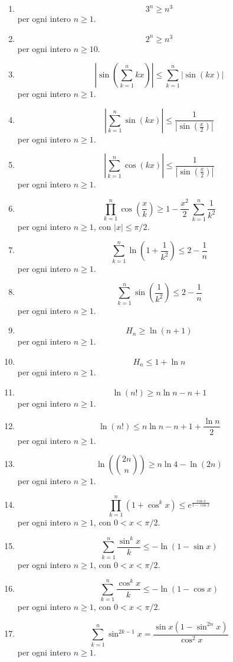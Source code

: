 \documentclass[11pt,a4paper]{article}
\begin{document}
\begin{enumerate}
\item \[ 3^{n} \ge n^{3} \]
{\small per ogni intero $n\ge 1$.}
\item \[ 2^{n} \ge n^{3} \]
{\small per ogni intero $n\ge 10$.}
\item \[ \left|\sin\left(\sum_{k=1}^{n} k x\right)\right| \le \sum_{k=1}^{n} \left|\sin\left(k x\right)\right| \]
{\small per ogni intero $n\ge 1$.}
\item \[ \left|\sum_{k=1}^{n} \sin\left(k x\right)\right| \le \frac{1}{\left|\sin\left(\frac{x}{2}\right)\right|} \]
{\small per ogni intero $n\ge 1$.}
\item \[ \left|\sum_{k=1}^{n} \cos\left(k x\right)\right| \le \frac{1}{\left|\sin\left(\frac{x}{2}\right)\right|} \]
{\small per ogni intero $n\ge 1$.}
\item \[ \prod_{k=1}^{n} \cos\left(\frac{x}{k}\right) \ge 1 - \frac{x^{2}}{2}\,\sum_{k=1}^{n} \frac{1}{k^{2}} \]
{\small per ogni intero $n\ge 1$, con $|x|\le\pi/2$.}
\item \[ \sum_{k=1}^{n} \ln\left(1 + \frac{1}{k^{2}}\right) \le 2 - \frac{1}{n} \]
{\small per ogni intero $n\ge 1$.}
\item \[ \sum_{k=1}^{n} \sin\left(\frac{1}{k^{2}}\right) \le 2 - \frac{1}{n} \]
{\small per ogni intero $n\ge 1$.}
\item \[ H_{n} \ge \ln\left(n + 1\right) \]
{\small per ogni intero $n\ge 1$.}
\item \[ H_{n} \le 1 + \ln n \]
{\small per ogni intero $n\ge 1$.}
\item \[ \ln\left(n!\right) \ge n\ln n - n + 1 \]
{\small per ogni intero $n\ge 1$.}
\item \[ \ln\left(n!\right) \le n\ln n - n + 1 + \frac{\ln n}{2} \]
{\small per ogni intero $n\ge 1$.}
\item \[ \ln\left(\binom{2n}{n}\right) \ge n\ln 4 - \ln\left(2n\right) \]
{\small per ogni intero $n\ge 1$.}
\item \[ \prod_{k=1}^{n} \left(1 + \cos^{k} x\right) \le e^{\frac{\cos x}{1 - \cos x}} \]
{\small per ogni intero $n\ge 1$, con $0<x<\pi/2$.}
\item \[ \sum_{k=1}^{n} \frac{\sin^{k} x}{k} \le -\ln\left(1 - \sin x\right) \]
{\small per ogni intero $n\ge 1$, con $0<x<\pi/2$.}
\item \[ \sum_{k=1}^{n} \frac{\cos^{k} x}{k} \le -\ln\left(1 - \cos x\right) \]
{\small per ogni intero $n\ge 1$, con $0<x<\pi/2$.}
\item \[ \sum_{k=1}^{n} \sin^{2k - 1} x = \frac{\sin x\left(1 - \sin^{2n} x\right)}{\cos^{2} x} \]
{\small per ogni intero $n\ge 1$.}
\end{enumerate}
\end{document}
